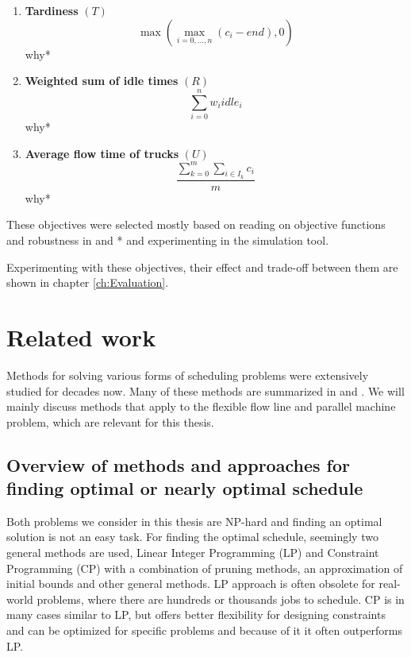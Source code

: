 \documentclass{ctuthesis}
\begin{document}
\begin{enumerate}
\item \textbf{Tardiness} $(T)$\\ \begin{equation}\max(\max_{i=0,\ldots,n}( c_i - end), 0)\end{equation}
why*
\item \textbf{Weighted sum of idle times} $(R)$\\ 
\begin{equation}
    \sum_{i=0}^{n} w_iidle_i
\end{equation}
why*
\item \textbf{Average flow time of trucks} $(U)$
\begin{equation} 
    \dfrac{\sum_{k=0}^{m} \sum_{i \in I_k} c_i}{m}
\end{equation}
why*
\end{enumerate}

 These objectives were selected mostly based on reading on objective functions and robustness in \cite{pinedo} and \cite{tkindt}* and experimenting in the simulation tool. 
 
 Experimenting with these objectives, their effect and trade-off between them are shown in chapter \ref{ch:Evaluation}.

\chapter{Related work}
\label{chap:Related work}
Methods for solving various forms of scheduling problems were extensively studied for decades now. Many of these methods are summarized in \cite{pinedo} and \cite{bucker}. We will mainly discuss methods that apply to the flexible flow line and parallel machine problem, which are relevant for this thesis. 

\section{Overview of methods and approaches for finding optimal or nearly optimal schedule}

Both problems we consider in this thesis are NP-hard \cite{complexity} and finding an optimal solution is not an easy task. For finding the optimal schedule, seemingly two general methods are used, Linear Integer Programming (LP) and Constraint Programming (CP) with a combination of pruning methods, an approximation of initial bounds and other general methods. LP approach is often obsolete for real-world problems, where there are hundreds or thousands jobs to schedule. CP is in many cases similar to LP, but offers better flexibility for designing constraints and can be optimized for specific problems and because of it it often outperforms LP.
\end{document}

